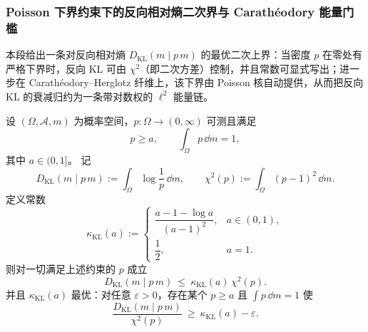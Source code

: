 \subsubsection{Poisson 下界约束下的反向相对熵二次界与 Carath\'eodory 能量门槛}\label{subsubsec:xi-reversekl-variance-poisson-carath-energy}
本段给出一条对反向相对熵 \(D_{\mathrm{KL}}(m\mid p\,m)\) 的最优二次上界：当密度 \(p\) 在零处有严格下界时，反向 KL 可由 \(\chi^2\)（即二次方差）控制，并且常数可显式写出；进一步在 Carath\'eodory--Herglotz 纤维上，该下界由 Poisson 核自动提供，从而把反向 KL 的衰减归约为一条带对数权的 \(\ell^2\) 能量链。

\begin{theorem}\label{thm:xi-reversekl-chi2-optimal-under-lower-bound}
设 \((\Omega,\mathcal A,m)\) 为概率空间，\(p:\Omega\to(0,\infty)\) 可测且满足
\[
p\ge a,\qquad \int_\Omega p\,\dd m=1,
\]
其中 \(a\in(0,1]\)。
记
\[
D_{\mathrm{KL}}(m\mid p\,m):=\int_\Omega \log\frac{1}{p}\,\dd m,
\qquad
\chi^2(p):=\int_\Omega (p-1)^2\,\dd m.
\]
定义常数
\[
\kappa_{\mathrm{KL}}(a):=
\begin{cases}
\dfrac{a-1-\log a}{(a-1)^2},& a\in(0,1),\\[6pt]
\dfrac12,& a=1.
\end{cases}
\]
则对一切满足上述约束的 \(p\) 成立
\[
D_{\mathrm{KL}}(m\mid p\,m)\ \le\ \kappa_{\mathrm{KL}}(a)\,\chi^2(p).
\]
并且 \(\kappa_{\mathrm{KL}}(a)\) 最优：对任意 \(\varepsilon>0\)，存在某个 \(p\ge a\) 且 \(\int p\,\dd m=1\) 使
\[
\frac{D_{\mathrm{KL}}(m\mid p\,m)}{\chi^2(p)}\ \ge\ \kappa_{\mathrm{KL}}(a)-\varepsilon.
\]
\end{theorem}
